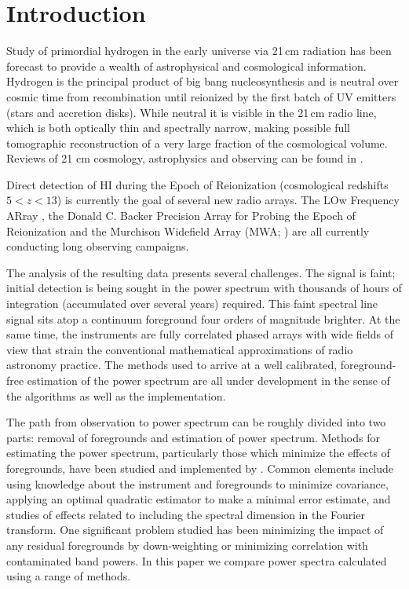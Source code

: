 \documentclass[twolcolumn,iop]{emulateapj}
\begin{document}
\section{Introduction} 
  Study of primordial hydrogen  in the early universe via 21\,cm radiation has been forecast to provide a wealth of astrophysical and cosmological information.   Hydrogen is the principal product of big bang nucleosynthesis and is neutral over cosmic time from recombination until reionized by the first batch of UV emitters (stars and accretion disks). While neutral it is visible in the 21\,cm radio line, which is both optically thin and spectrally narrow, making possible full tomographic reconstruction of a very large fraction of the cosmological volume.  Reviews of 21 cm cosmology, astrophysics and observing can be found in \cite{Morales:2010p8093,Furlanetto:2006p2267,Pritchard:2012p9555,zaroubi2013epoch}.
  
Direct detection of HI during the Epoch of Reionization (cosmological redshifts $5<z<13$) is currently the goal of several new radio arrays. The LOw Frequency ARray \citep[LOFAR;][]{Yatawatta:2013p9699}, the Donald C. Backer Precision Array for Probing the Epoch of Reionization \citep[PAPER][]{Parsons:2014p10499} and the Murchison Widefield Array (MWA; \cite{Tingay:2013p9022,Bowman:2013p9950}) are all currently conducting long observing campaigns.



The analysis of the resulting data presents several challenges. The signal is faint; initial detection is being sought in the power spectrum with thousands of hours of integration (accumulated over several years) required. This faint spectral line signal sits atop a continuum foreground four orders of magnitude brighter. At the same time, the instruments are fully correlated phased arrays with wide fields of view that strain the conventional mathematical approximations of radio astronomy practice. The methods used to arrive at a well calibrated, foreground-free estimation of the power spectrum are all under development in the sense of the algorithms as well as the implementation.  


The path from observation to power spectrum can be roughly divided into two parts: removal of foregrounds and estimation of power spectrum. 
Methods for estimating the power spectrum, particularly those which minimize the effects of foregrounds, have been studied and implemented by \citet{Morales:2006p1870,Morales:2012p8790,Dillon:2013p10497,Dillon:2014p9788,Liu:2011p8763,Trott:2012p10466,2014PhRvD..90b3018L,2014PhRvD..90b3019L}. Common elements include using knowledge about the instrument and foregrounds to minimize covariance, applying an optimal quadratic estimator to make a minimal error estimate, and studies of effects related to including the spectral dimension in the Fourier transform.  One significant problem studied has been minimizing the impact of any residual foregrounds by down-weighting or minimizing correlation with contaminated band powers. In this paper we compare power spectra calculated using a range of methods. 
\end{document}
